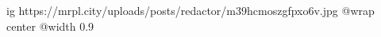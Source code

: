  
 
 
 
 

\ifcmt
  ig https://mrpl.city/uploads/posts/redactor/m39hcmoszgfpxo6v.jpg
  @wrap center
  @width 0.9
\fi
